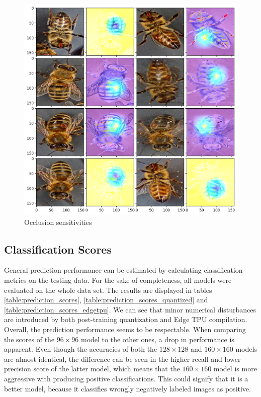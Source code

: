 \documentclass[12pt,a4paper]{article}
\begin{document}
\begin{figure}[H]
\centering
\includegraphics[width=13.5cm]{occlusion_sensitivity.png}
\caption{Occlusion sensitivities}
\label{figure:occlusion_sensitivity}
\end{figure}

\subsection{Classification Scores}

General prediction performance can be estimated by calculating classification metrics on the testing data. For the sake of completeness, all models were evaluated on the whole data set. The results are displayed in tables \ref{table:prediction_scores}, \ref{table:prediction_scores_quantized} and \ref{table:prediction_scores_edgetpu}. We can see that minor numerical disturbances are introduced by both post-training quantization and Edge TPU compilation. Overall, the prediction performance seems to be respectable. When comparing the scores of the $96 \times 96$ model to the other ones, a drop in performance is apparent. Even though the accuracies of both the $128 \times 128$ and $160 \times 160$ models are almost identical, the difference can be seen in the higher recall and lower precision score of the latter model, which means that the  $160 \times 160$  model is more aggressive with producing positive classifications. This could signify that it is a better model, because it classifies wrongly negatively labeled images as positive.
\end{document}
